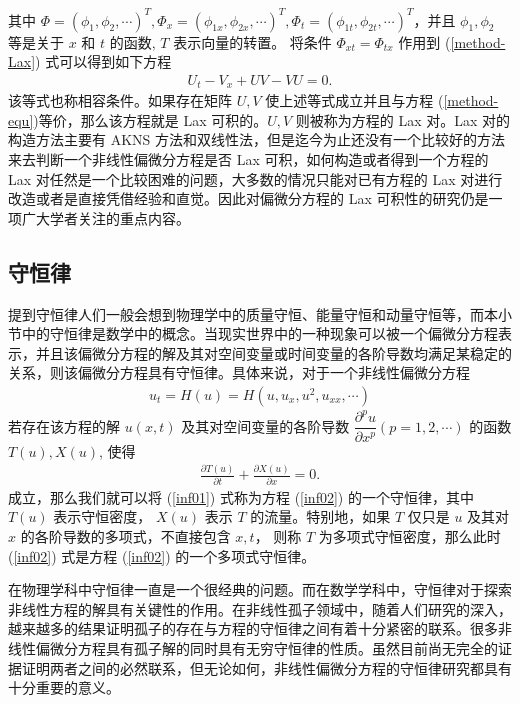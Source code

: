 其中 $\Phi=(\phi_1, \phi_2, \cdots)^T, \Phi_x=(\phi_{1x}, \phi_{2x}, \cdots)^T, \Phi_t=(\phi_{1t}, \phi_{2t}, \cdots)^T$，并且 $\phi_1, \phi_2$ 等是关于 $x$ 和 $t$ 的函数, $T$ 表示向量的转置。 将条件 $\Phi_{xt}=\Phi_{tx}$ 作用到 (\ref{method-Lax}) 式可以得到如下方程
\begin{align}
U_t-V_x+UV-VU=0.
\end{align}
该等式也称相容条件。如果存在矩阵 $U, V$ 使上述等式成立并且与方程 (\ref{method-equ})等价，那么该方程就是  Lax 可积的。$U, V$ 则被称为方程的 Lax 对。Lax 对的构造方法主要有  AKNS 方法和双线性法，但是迄今为止还没有一个比较好的方法来去判断一个非线性偏微分方程是否 Lax 可积，如何构造或者得到一个方程的 Lax 对任然是一个比较困难的问题，大多数的情况只能对已有方程的 Lax 对进行改造或者是直接凭借经验和直觉。因此对偏微分方程的 Lax 可积性的研究仍是一项广大学者关注的重点内容。

\subsection{守恒律}
提到守恒律人们一般会想到物理学中的质量守恒、能量守恒和动量守恒等，而本小节中的守恒律是数学中的概念。当现实世界中的一种现象可以被一个偏微分方程表示，并且该偏微分方程的解及其对空间变量或时间变量的各阶导数均满足某稳定的关系，则该偏微分方程具有守恒律。具体来说，对于一个非线性偏微分方程
\begin{align}
u_t = H(u) =  H(u, u_x, u^2,u_{xx}, \cdots)\label{inf02}
\end{align}
若存在该方程的解  $u(x, t)$ 及其对空间变量的各阶导数 $\dfrac{\partial^pu}{\partial x^p}(p=1,2,\cdots)$ 的函数 $T(u), X(u)$, 使得
\begin{align}
\frac{\partial T(u)}{\partial t}+\frac{\partial X(u)}{\partial x}=0. \label{inf01}
\end{align}
成立，那么我们就可以将 (\ref{inf01}) 式称为方程 (\ref{inf02}) 的一个守恒律，其中 $T(u)$ 表示守恒密度， $X(u)$ 表示 $T$ 的流量。特别地，如果 $T$ 仅只是 $u$ 及其对 $x$ 的各阶导数的多项式，不直接包含 $x, t$， 则称 $T$ 为多项式守恒密度，那么此时 (\ref{inf02}) 式是方程 (\ref{inf02}) 的一个多项式守恒律。

在物理学科中守恒律一直是一个很经典的问题。而在数学学科中，守恒律对于探索非线性方程的解具有关键性的作用。在非线性孤子领域中，随着人们研究的深入，越来越多的结果证明孤子的存在与方程的守恒律之间有着十分紧密的联系。很多非线性偏微分方程具有孤子解的同时具有无穷守恒律的性质。虽然目前尚无完全的证据证明两者之间的必然联系，但无论如何，非线性偏微分方程的守恒律研究都具有十分重要的意义。


